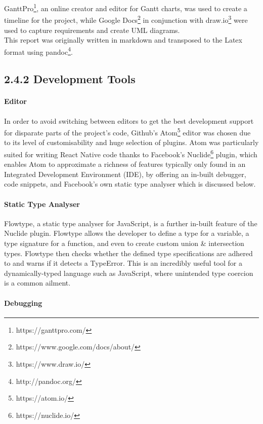 GanttPro\footnote{https://ganttpro.com/}, an online creator and
editor for Gantt charts, was used to create a timeline for the project,
while Google Docs\footnote{https://www.google.com/docs/about/}
in conjunction with draw.io\footnote{https://www.draw.io/} were
used to capture requirements and create UML diagrams.\\
This report was originally written in markdown and transposed to the
Latex format using pandoc\footnote{http://pandoc.org/}.

\subsection{2.4.2 Development Tools}\label{development-tools}

\paragraph{Editor}\label{editor}

In order to avoid switching between editors to get the best development
support for disparate parts of the project's code, Github's
Atom\footnote{https://atom.io/} editor was chosen due to its level
of customisability and huge selection of plugins. Atom was particularly
suited for writing React Native code thanks to Facebook's
Nuclide\footnote{https://nuclide.io/} plugin, which enables Atom
to approximate a richness of features typically only found in an
Integrated Development Environment (IDE), by offering an in-built
debugger, code snippets, and Facebook's own static type analyser which
is discussed below.

\paragraph{Static Type Analyser}\label{static-type-analyser}

Flowtype\cite{1flowtype}, a static type
analyser for JavaScript, is a further in-built feature of the Nuclide
plugin. Flowtype allows the developer to define a type for a variable, a
type signature for a function, and even to create custom union \&
intersection types. Flowtype then checks whether the defined type
specifications are adhered to and warns if it detects a TypeError. This
is an incredibly useful tool for a dynamically-typed language such as
JavaScript, where unintended type coercion is a common ailment.

\paragraph{Debugging}\label{debugging}

